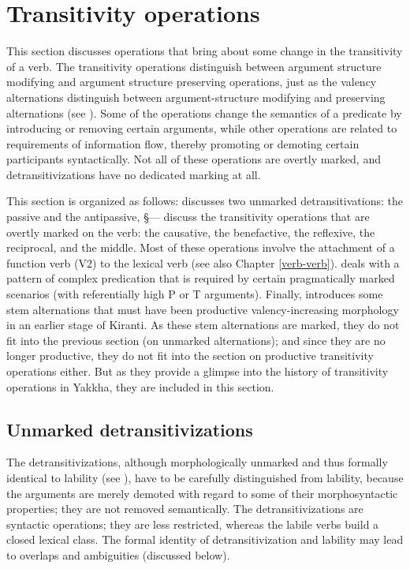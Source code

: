 \section{Transitivity operations}\label{trans-op}

This section discusses operations that bring about some change in the transitivity of a verb. The transitivity operations distinguish between argument structure modifying and argument structure preserving operations, just as the valency alternations distinguish between argument-structure modifying and preserving alternations (see  ). Some of the operations change the semantics of a predicate by introducing or removing certain arguments, while other operations are related to requirements of information flow, thereby promoting or demoting certain participants syntactically. Not all of these operations are overtly marked, and detransitivizations have no dedicated marking at all.  

This section is organized as follows:  discusses two unmarked detransitivations: the passive and the antipassive, §— discuss the transitivity operations that are overtly marked on the verb: the causative, the benefactive, the reflexive, the  reciprocal, and the middle. Most of these operations involve the attachment of a function verb  (V2) to the lexical verb (see also Chapter \ref{verb-verb}).  deals with a pattern of complex predication that is required by certain pragmatically marked scenarios (with referentially high P or T arguments). Finally,  introduces some stem alternations that must have been productive valency-increasing morphology  in an earlier stage of Kiranti. As these stem alternations are marked, they do not fit into the previous section (on unmarked alternations); and since they are no longer productive, they do not fit into the section on productive transitivity operations either. But as they provide a glimpse into the history of transitivity operations in Yakkha, they are included in this section.

\subsection{Unmarked detransitivizations}\label{detrans}

The detransitivizations, although morphologically unmarked and thus  formally identical to lability (see ), have to be carefully distinguished from lability, because the arguments are merely demoted with regard to some of their morphosyntactic properties; they are not removed semantically. The detransitivizations are syntactic operations; they are less restricted, whereas the labile verbs build a closed lexical class. The formal identity of detransitivization and lability may lead to overlaps and ambiguities (discussed below).

